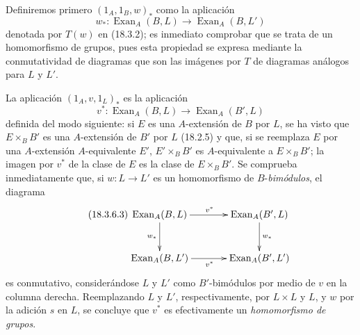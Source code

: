 \begin{env}[18.3.6]
\label{0.18.3.6-fr}
Definiremos primero $(1_A,1_B,w)_*$ como la aplicación
\begin{equation}
\label{0.18.3.6.1-fr}
\tag{18.3.6.1}
  w_*:\operatorname{Exan}_A(B,L)\longrightarrow
  \operatorname{Exan}_A(B,L')
\end{equation}
denotada por $T(w)$ en (18.3.2); es inmediato comprobar que se trata de un
homomorfismo de grupos, pues esta propiedad se expresa mediante la
conmutatividad de diagramas que son las imágenes por $T$ de diagramas análogos
para $L$ y $L'$.

La aplicación $(1_A,v,1_L)_*$ es la aplicación
\begin{equation}
\label{0.18.3.6.2-fr}
\tag{18.3.6.2}
  v^*:\operatorname{Exan}_A(B,L)\longrightarrow
  \operatorname{Exan}_A(B',L)
\end{equation}
definida del modo siguiente: si $E$ es una $A$-extensión de $B$ por $L$, se ha
visto que $E\times_BB'$ es una $A$-extensión de $B'$ por $L$ (18.2.5) y que,
si se reemplaza $E$ por una $A$-extensión $A$-equivalente $E'$,
$E'\times_BB'$ es $A$-equivalente a $E\times_BB'$; la imagen por $v^*$ de la
clase de $E$ es la clase de $E\times_BB'$. Se comprueba inmediatamente que, si
$w:L\to L'$ es un homomorfismo de $B$-\emph{bimódulos}, el diagrama
\begin{equation}
\label{0.18.3.6.3-fr}
\tag{18.3.6.3}
  \xymatrix@C=3pc@R=2.4pc{
    \operatorname{Exan}_A(B,L)\ar[r]^{v^*}\ar[d]_{w_*}
      & \operatorname{Exan}_A(B',L)\ar[d]^{w_*}\\
    \operatorname{Exan}_A(B,L')\ar[r]_{v^*}
      & \operatorname{Exan}_A(B',L')
  }
\end{equation}
es conmutativo, considerándose $L$ y $L'$ como $B'$-bimódulos por medio de
$v$ en la columna derecha. Reemplazando $L$ y $L'$, respectivamente, por
$L\times L$ y $L$, y $w$ por la adición $s$ en $L$, se concluye que $v^*$ es
efectivamente un \emph{homomorfismo de grupos}.


\end{env}
